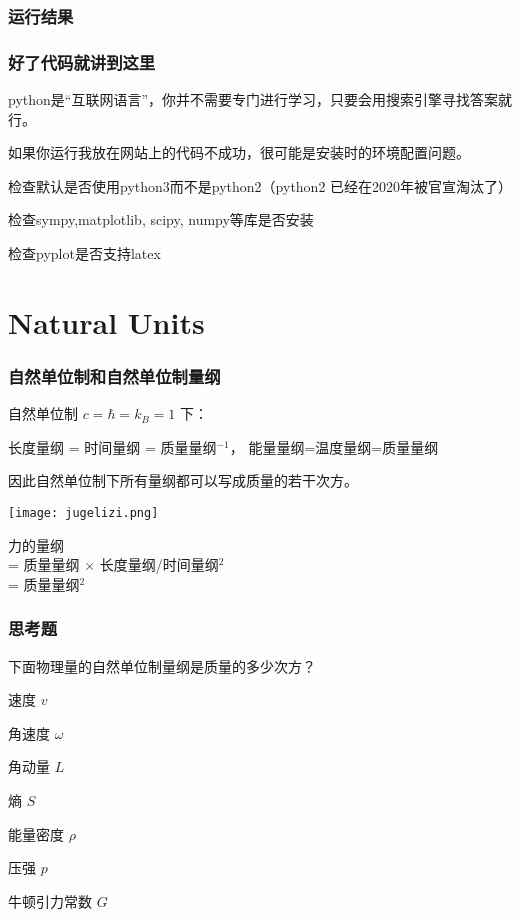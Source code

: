 \documentclass[CJK,13pt]{beamer}
\begin{document}
\begin{frame}
  \frametitle{运行结果}
\end{frame}


\begin{frame}
  \frametitle{好了代码就讲到这里}
  python是“互联网语言”，你并不需要专门进行学习，只要会用搜索引擎寻找答案就行。
  

  如果你运行我放在网站上的代码不成功，很可能是安装时的环境配置问题。  
  \bitem
\item{检查默认是否使用python3而不是python2（python2 已经在2020年被官宣淘汰了）}
\item{检查sympy,matplotlib, scipy, numpy等库是否安装}
\item{检查pyplot是否支持latex}
  \eitem
\end{frame}

\section{Natural Units}


\begin{frame}
\frametitle{ 自然单位制和自然单位制量纲 }
 {\blue 自然单位制  $c = \hbar  = k_B=1$} 下：

{\blue 长度量纲 = 时间量纲 = 质量量纲$^{-1}$， 能量量纲=温度量纲=质量量纲 }

因此自然单位制下所有量纲都可以写成质量的若干次方。


\begin{minipage}{0.3\textwidth}
\texttt{[image: jugelizi.png]}
\end{minipage}
\begin{minipage}{0.6\textwidth}
力的量纲 \\
= 质量量纲 $\times$ 长度量纲/时间量纲$^2$ \\
= 质量量纲$^2$

\end{minipage}

\end{frame}

\begin{frame}
\frametitle{ 思考题}


下面物理量的自然单位制量纲是质量的多少次方？

速度 $v$

角速度 $\omega$

角动量 $L$

熵 $S$

能量密度 $\rho$

压强 $p$

牛顿引力常数 $G$

\end{frame}
\end{document}
